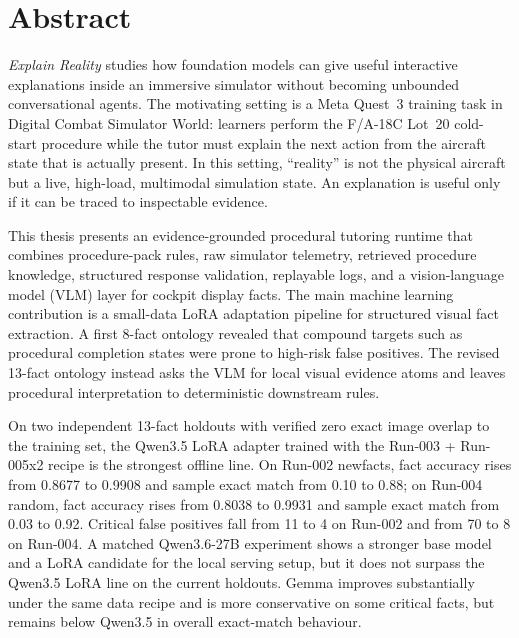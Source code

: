 %

\chapter*{Abstract}

\emph{Explain Reality} studies how foundation models can give useful
interactive explanations inside an immersive simulator without becoming
unbounded conversational agents. The motivating setting is a Meta Quest~3
training task in Digital Combat Simulator World: learners perform the
F/A-18C Lot~20 cold-start procedure while the tutor must explain the next
action from the aircraft state that is actually present. In this setting,
``reality'' is not the physical aircraft but a live, high-load, multimodal
simulation state. An explanation is useful only if it can be traced to
inspectable evidence.

This thesis presents an evidence-grounded procedural tutoring runtime that
combines procedure-pack rules, raw simulator telemetry, retrieved
procedure knowledge, structured response validation, replayable logs, and a
vision-language model (VLM) layer for cockpit display facts. The main machine
learning contribution is a small-data LoRA adaptation pipeline for structured
visual fact extraction. A first 8-fact ontology revealed that compound targets
such as procedural completion states were prone to high-risk false positives.
The revised 13-fact ontology instead asks the VLM for local visual evidence
atoms and leaves procedural interpretation to deterministic downstream rules.

On two independent 13-fact holdouts with verified zero exact image overlap to the
training set, the Qwen3.5 LoRA adapter trained with the Run-003 + Run-005x2
recipe is the strongest offline line. On Run-002 newfacts, fact accuracy rises
from 0.8677 to 0.9908 and sample exact match from 0.10 to 0.88; on Run-004
random, fact accuracy rises from 0.8038 to 0.9931 and sample exact match from
0.03 to 0.92. Critical false positives fall from 11 to 4 on Run-002 and from
70 to 8 on Run-004. A matched Qwen3.6-27B experiment shows a stronger base
model and a LoRA candidate for the local serving setup, but it does not surpass
the Qwen3.5 LoRA line on the current holdouts. Gemma improves substantially
under the same data recipe and is more conservative on some critical facts, but
remains below Qwen3.5 in overall exact-match behaviour.

